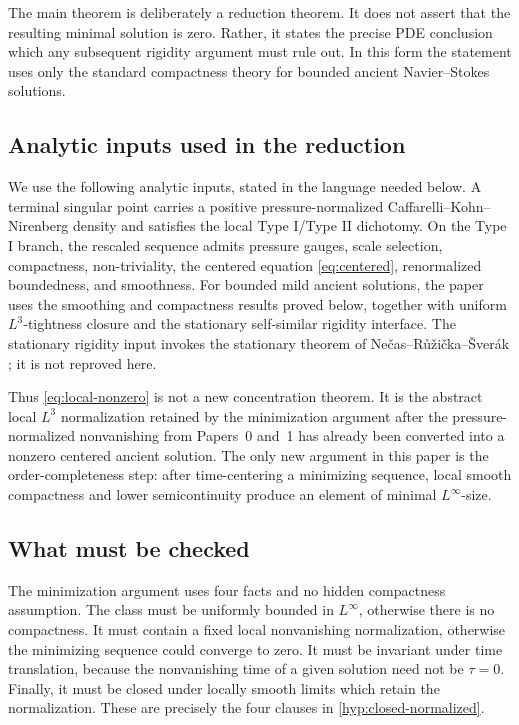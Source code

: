 \documentclass[11pt]{amsart}
\theoremstyle{plain}
\theoremstyle{definition}
\theoremstyle{remark}
\numberwithin{equation}{section}
\begin{document}
The main theorem is deliberately a reduction theorem.  It does not assert that
the resulting minimal solution is zero.  Rather, it states the precise
PDE conclusion which any subsequent rigidity argument must rule out.  In this
form the statement uses only the standard compactness theory for bounded
ancient Navier--Stokes solutions.

\subsection{Analytic inputs used in the reduction}

We use the following analytic inputs, stated in the language needed below.  A
terminal singular point carries a positive pressure-normalized
Caffarelli--Kohn--Nirenberg density and satisfies the local Type I/Type II
dichotomy.  On the Type I branch, the rescaled sequence admits pressure gauges,
scale selection, compactness, non-triviality, the centered equation
\eqref{eq:centered}, renormalized boundedness, and smoothness.  For bounded
mild ancient solutions, the paper uses the smoothing and compactness results
proved below, together with uniform \(L^3\)-tightness closure and the stationary
self-similar rigidity interface.  The stationary rigidity input invokes the
stationary theorem of
Ne\v{c}as--R\r{u}\v{z}i\v{c}ka--\v{S}ver\'ak \cite{NRS1996}; it is not
reproved here.

Thus \eqref{eq:local-nonzero} is not a new concentration theorem.  It is the
abstract local \(L^3\) normalization retained by the minimization argument
after the pressure-normalized nonvanishing from Papers~0 and~1 has already
been converted into a nonzero centered ancient solution.  The only new
argument in this paper is the order-completeness step: after time-centering a
minimizing sequence, local smooth compactness and lower semicontinuity produce
an element of minimal \(L^\infty\)-size.

\subsection{What must be checked}

The minimization argument uses four facts and no hidden compactness
assumption.  The class must be uniformly bounded in \(L^\infty\), otherwise
there is no compactness.  It must contain a fixed local nonvanishing
normalization, otherwise the minimizing sequence could converge to zero.  It
must be invariant under time translation, because the nonvanishing time of a
given solution need not be \(\tau=0\).  Finally, it must be closed under
locally smooth limits which retain the normalization.  These are precisely the
four clauses in \cref{hyp:closed-normalized}.
\end{document}
